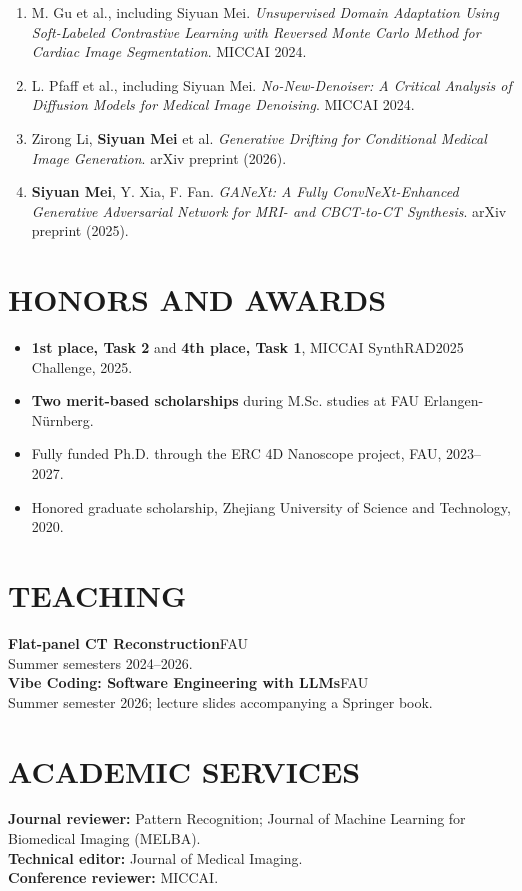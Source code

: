 \documentclass[10pt,a4paper]{article}
\newcommand{\entry}[3]{\textbf{#1}\hfill #2\\[-1pt]#3}
\newcommand{\pub}[4]{\item[\textbf{#1}] #2. \textit{#3}. #4.}
\begin{document}
\begin{enumerate}
    \pub{[C.7]}{M. Gu et al., including Siyuan Mei}{Unsupervised Domain Adaptation Using Soft-Labeled Contrastive Learning with Reversed Monte Carlo Method for Cardiac Image Segmentation}{MICCAI 2024}
    \pub{[C.8]}{L. Pfaff et al., including Siyuan Mei}{No-New-Denoiser: A Critical Analysis of Diffusion Models for Medical Image Denoising}{MICCAI 2024}
    \pub{[M.1]}{Zirong Li, \textbf{Siyuan Mei} et al}{Generative Drifting for Conditional Medical Image Generation}{arXiv preprint (2026)}
    \pub{[M.2]}{\textbf{Siyuan Mei}, Y. Xia, F. Fan}{GANeXt: A Fully ConvNeXt-Enhanced Generative Adversarial Network for MRI- and CBCT-to-CT Synthesis}{arXiv preprint (2025)}
\end{enumerate}

\section{HONORS AND AWARDS}
\begin{itemize}
    \item \textbf{1st place, Task 2} and \textbf{4th place, Task 1}, MICCAI SynthRAD2025 Challenge, 2025.
    \item \textbf{Two merit-based scholarships} during M.Sc. studies at FAU Erlangen-Nürnberg.
    \item Fully funded Ph.D. through the ERC 4D Nanoscope project, FAU, 2023--2027.
    \item Honored graduate scholarship, Zhejiang University of Science and Technology, 2020.
\end{itemize}

\section{TEACHING}
\entry{Flat-panel CT Reconstruction}{FAU}{Summer semesters 2024--2026.}\\[3pt]
\entry{Vibe Coding: Software Engineering with LLMs}{FAU}{Summer semester 2026; lecture slides accompanying a Springer book.}\\[4pt]
\section{ACADEMIC SERVICES}
\textbf{Journal reviewer:} Pattern Recognition; Journal of Machine Learning for Biomedical Imaging (MELBA).\\
\textbf{Technical editor:} Journal of Medical Imaging.\\
\textbf{Conference reviewer:} MICCAI.
\end{document}
